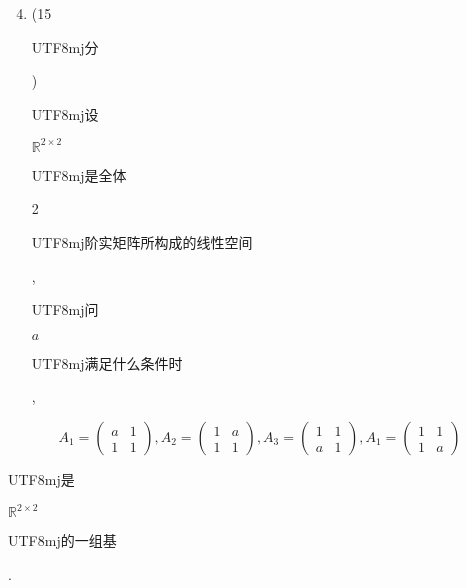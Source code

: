 \documentclass[10pt]{article}
\begin{document}
\begin{enumerate}
  \setcounter{enumi}{3}
  \item (15 \begin{CJK}{UTF8}{mj}分\end{CJK}) \begin{CJK}{UTF8}{mj}设\end{CJK} $\mathbb{R}^{2 \times 2}$ \begin{CJK}{UTF8}{mj}是全体\end{CJK} 2 \begin{CJK}{UTF8}{mj}阶实矩阵所构成的线性空间\end{CJK}, \begin{CJK}{UTF8}{mj}问\end{CJK} $a$ \begin{CJK}{UTF8}{mj}满足什么条件时\end{CJK},
\end{enumerate}
$$
A_{1}=\left(\begin{array}{cc}
a & 1 \\
1 & 1
\end{array}\right), A_{2}=\left(\begin{array}{ll}
1 & a \\
1 & 1
\end{array}\right), A_{3}=\left(\begin{array}{ll}
1 & 1 \\
a & 1
\end{array}\right), A_{1}=\left(\begin{array}{ll}
1 & 1 \\
1 & a
\end{array}\right)
$$
\begin{CJK}{UTF8}{mj}是\end{CJK} $\mathbb{R}^{2 \times 2}$ \begin{CJK}{UTF8}{mj}的一组基\end{CJK}.
\end{document}
